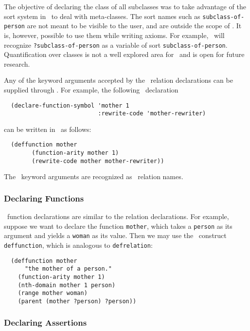 The objective of declaring the class of all subclasses was to take
advantage of the sort system in \snark\  to deal with meta-classes.
The sort names such as \verb'subclass-of-person' are not meant
to be visible to the user, and are outside the scope of \kifsnark.
It is, however, possible to use them while writing axioms. For example,
\snark\  will recognize \verb'?subclass-of-person' as a variable of sort
\verb'subclass-of-person'.  Quantification over classes is not a well
explored area for \kifsnark\  and is open for future research.

Any of the keyword arguments accepted by the \snark\  relation
declarations can be supplied through \kifsnark.  For example,
the following \snark\  declaration
\begin{verbatim}
  (declare-function-symbol 'mother 1
                           :rewrite-code 'mother-rewriter)
 \end{verbatim}
can be written in \kifsnark\  as follows:
\begin{verbatim}
  (deffunction mother
        (function-arity mother 1)
        (rewrite-code mother mother-rewriter))
 \end{verbatim}
The \snark\  keyword arguments are recognized as \kifsnark\  relation
names.

\subsubsection{Declaring Functions}
\label{subsec-kif-functions}

\Kif\  function declarations are similar to the relation declarations.  For
   example, suppose we want to declare the function \verb'mother', which
      takes a \verb'person' as its argument and yields a \verb'woman' as its
      value.   Then we may use the \kif\   construct
      \verb'deffunction', which is analogous to \verb'defrelation':
\begin{verbatim}
  (deffunction mother
      "the mother of a person."
    (function-arity mother 1)
    (nth-domain mother 1 person)
    (range mother woman)
    (parent (mother ?person) ?person))
\end{verbatim}

\subsubsection{Declaring Assertions}
\label{subsec-kif-assertions}

